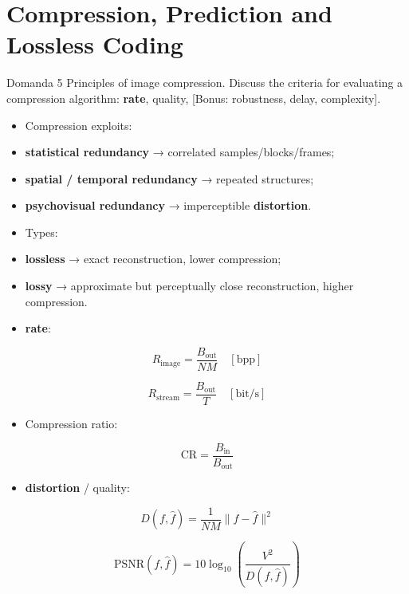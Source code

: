 \section{Compression, Prediction and Lossless Coding}




\begin{questionbox}{Domanda 5}
Principles of image compression. Discuss the criteria for evaluating a compression algorithm: \textbf{rate}, quality, [Bonus: robustness, delay, complexity].
\end{questionbox}


\begin{itemize}
  \item Compression exploits:
  \item \textbf{statistical redundancy} → correlated samples/blocks/frames;
  \item \textbf{spatial / temporal redundancy} → repeated structures;
  \item \textbf{psychovisual redundancy} → imperceptible \textbf{distortion}.
  \item Types:
  \item \textbf{\textbf{lossless}} → exact reconstruction, lower compression;
  \item \textbf{\textbf{lossy}} → approximate but perceptually close reconstruction, higher compression.
  \item \textbf{rate}:
\end{itemize}


$$
R_{\text{image}} = \frac{B_{\text{out}}}{NM} \quad [\text{bpp}]
$$



$$
R_{\text{stream}} = \frac{B_{\text{out}}}{T} \quad [\text{bit/s}]
$$


\begin{itemize}
  \item Compression ratio:
\end{itemize}


$$
\text{CR} = \frac{B_{\text{in}}}{B_{\text{out}}}
$$


\begin{itemize}
  \item \textbf{distortion} / quality:
\end{itemize}


$$
D(f,\hat{f}) = \frac{1}{NM}\|f-\hat{f}\|^2
$$



$$
\text{PSNR}(f,\hat{f}) = 10\log_{10}\left(\frac{V^2}{D(f,\hat{f})}\right)
$$


